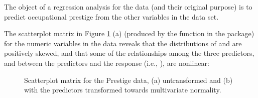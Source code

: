 \documentclass[
]{jss}
\begin{document}
The object of a regression analysis for the  data (and
their original purpose) is to predict occupational prestige from the
other variables in the data set.

The scatterplot matrix in Figure \ref{fig:scatterplot-matrix} (a)
(produced by the  function in the 
package) for the numeric variables in the data reveals that the
distributions of  and  are positively skewed,
and that some of the relationships among the three predictors, and
between the predictors and the response (i.e., ), are
nonlinear:

\begin{CodeChunk}
\begin{figure}

{\centering {}

}

\caption[Scatterplot matrix for the Prestige data, (a) untransformed and (b) with the predictors transformed towards multivariate normality]{Scatterplot matrix for the Prestige data, (a) untransformed and (b) with the predictors transformed towards multivariate normality.}\label{fig:scatterplot-matrix}
\end{figure}
\end{CodeChunk}
\end{document}
